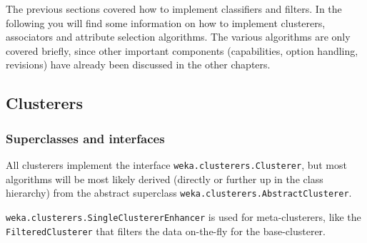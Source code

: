 %
%
%
%


The previous sections covered how to implement classifiers and filters. In the
following you will find some information on how to implement clusterers,
associators and attribute selection algorithms. The various algorithms are only
covered briefly, since other important components (capabilities, option
handling, revisions) have already been discussed in the other chapters.


\subsection{Clusterers}
\subsubsection*{Superclasses and interfaces}
All clusterers implement the interface \texttt{weka.clusterers.Clusterer},
but most algorithms will be most likely derived (directly or further up in the
class hierarchy) from the abstract superclass
\texttt{weka.clusterers.AbstractClusterer}.

\texttt{weka.clusterers.SingleClustererEnhancer} is used for meta-clusterers,
like the \texttt{FilteredClusterer} that filters the data on-the-fly for the
base-clusterer. \\

